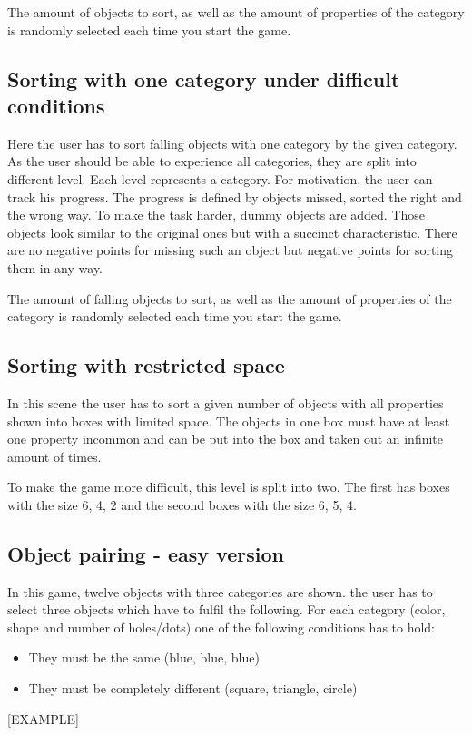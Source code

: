 The amount of objects to sort, as well as the amount of properties of the category
is randomly selected each time you start the game.

\subsection{Sorting with one category under difficult conditions}
Here the user has to sort falling objects with one category by the given category.
As the user should be able to experience all categories, they are split into different level.
Each level represents a category.
For motivation, the user can track his progress.
The progress is defined by objects missed, sorted the right and the wrong way.
To make the task harder, dummy objects are added.
Those objects look similar to the original ones but with a succinct characteristic.
There are no negative points for missing such an object but negative points for sorting them in any way.

The amount of falling objects to sort, as well as the amount of properties of the category
is randomly selected each time you start the game.

\subsection{Sorting with restricted space}
In this scene the user has to sort a given number of objects with all properties shown into boxes with limited space.
The objects in one box must have at least one property incommon and
can be put into the box and taken out an infinite amount of times.

To make the game more difficult, this level is split into two.
The first has boxes with the size 6, 4, 2 and the second boxes with the size 6, 5, 4.

\subsection{Object pairing - easy version}
In this game, twelve objects with three categories are shown.
the user has to select three objects which have to fulfil the following.
For each category (color, shape and number of holes/dots) one of the following conditions has to hold:
\begin{itemize}
    \item They must be the same (blue, blue, blue)
    \item They must be completely different (square, triangle, circle)
\end{itemize}
[EXAMPLE]

